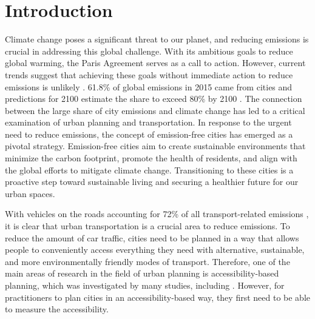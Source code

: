 \clearpage
\section{Introduction}
\label{sec:introduction}


Climate change poses a significant threat to our planet, and reducing emissions is crucial in addressing this global challenge.
With its ambitious goals to reduce global warming, the Paris Agreement serves as a call to action.
However, current trends suggest that achieving these goals without immediate action to reduce emissions is unlikely .
61.8\% of global emissions in 2015 came from cities and predictions for 2100 estimate the share to exceed 80\% by 2100 .
The connection between the large share of city emissions and climate change has led to a critical examination of urban planning and transportation.
In response to the urgent need to reduce emissions, the concept of emission-free cities has emerged as a pivotal strategy.
Emission-free cities aim to create sustainable environments that minimize the carbon footprint, promote the health of residents, and align with the global efforts to mitigate climate change.
Transitioning to these cities is a proactive step toward sustainable living and securing a healthier future for our urban spaces.


With vehicles on the roads accounting for 72\% of all transport-related emissions , it is clear that urban transportation is a crucial area to reduce emissions.
To reduce the amount of car traffic, cities need to be planned in a way that allows people to conveniently access everything they need with alternative, sustainable, and more environmentally friendly modes of transport.
Therefore, one of the main areas of research in the field of urban planning is accessibility-based planning, which was investigated by many studies, including .
However, for practitioners to plan cities in an accessibility-based way, they first need to be able to measure the accessibility.


